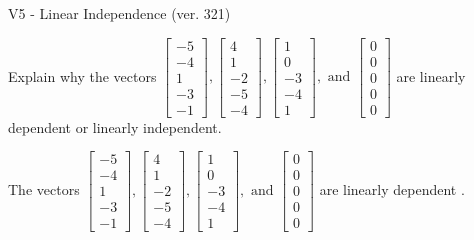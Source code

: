 \begin{exercise}
  \begin{exerciseTitle}V5 - Linear Independence (ver. 321)\end{exerciseTitle}
  \begin{exerciseStatement}
    Explain why the vectors \(\left[\begin{array}{r}
-5 \\
-4 \\
1 \\
-3 \\
-1
\end{array}\right] , \left[\begin{array}{r}
4 \\
1 \\
-2 \\
-5 \\
-4
\end{array}\right] , \left[\begin{array}{r}
1 \\
0 \\
-3 \\
-4 \\
1
\end{array}\right] , \text{ and } \left[\begin{array}{r}
0 \\
0 \\
0 \\
0 \\
0
\end{array}\right]\) are linearly dependent or linearly independent.	


  \end{exerciseStatement}
  \begin{exerciseAnswer}
   The vectors \(\left[\begin{array}{r}
-5 \\
-4 \\
1 \\
-3 \\
-1
\end{array}\right] , \left[\begin{array}{r}
4 \\
1 \\
-2 \\
-5 \\
-4
\end{array}\right] , \left[\begin{array}{r}
1 \\
0 \\
-3 \\
-4 \\
1
\end{array}\right] , \text{ and } \left[\begin{array}{r}
0 \\
0 \\
0 \\
0 \\
0
\end{array}\right]\) are 
  	 linearly dependent  .
  


  \end{exerciseAnswer}
\end{exercise}
